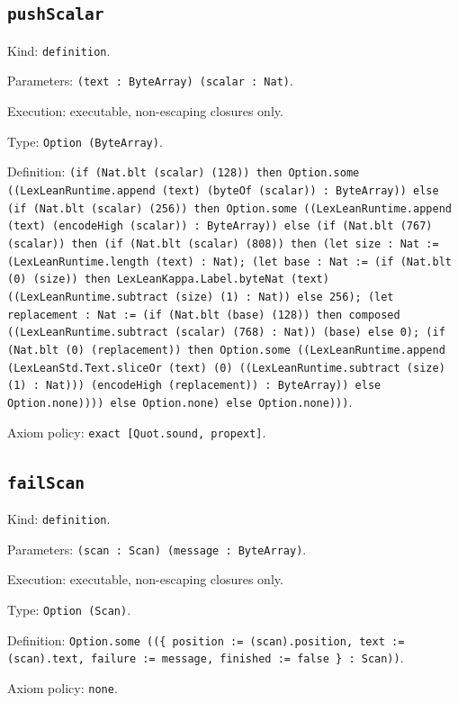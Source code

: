 \documentclass[11pt]{article}
\begin{document}
\subsection*{\texttt{pushScalar}}
\noindent Kind: \texttt{definition}.\par
\noindent Parameters: \texttt{(text : ByteArray) (scalar : Nat)}.\par
\noindent Execution: executable, non-escaping closures only.\par
\noindent Type: \texttt{Option (ByteArray)}.\par
\noindent Definition: \texttt{(if (Nat.blt (scalar) (128)) then Option.some ((LexLeanRuntime.append (text) (byteOf (scalar)) : ByteArray)) else (if (Nat.blt (scalar) (256)) then Option.some ((LexLeanRuntime.append (text) (encodeHigh (scalar)) : ByteArray)) else (if (Nat.blt (767) (scalar)) then (if (Nat.blt (scalar) (808)) then (let size : Nat := (LexLeanRuntime.length (text) : Nat); (let base : Nat := (if (Nat.blt (0) (size)) then LexLeanKappa.Label.byteNat (text) ((LexLeanRuntime.subtract (size) (1) : Nat)) else 256); (let replacement : Nat := (if (Nat.blt (base) (128)) then composed ((LexLeanRuntime.subtract (scalar) (768) : Nat)) (base) else 0); (if (Nat.blt (0) (replacement)) then Option.some ((LexLeanRuntime.append (LexLeanStd.Text.sliceOr (text) (0) ((LexLeanRuntime.subtract (size) (1) : Nat))) (encodeHigh (replacement)) : ByteArray)) else Option.none)))) else Option.none) else Option.none)))}.\par
\noindent Axiom policy: \texttt{exact [Quot.sound, propext]}.\par
\subsection*{\texttt{failScan}}
\noindent Kind: \texttt{definition}.\par
\noindent Parameters: \texttt{(scan : Scan) (message : ByteArray)}.\par
\noindent Execution: executable, non-escaping closures only.\par
\noindent Type: \texttt{Option (Scan)}.\par
\noindent Definition: \texttt{Option.some ((\{ position := (scan).position, text := (scan).text, failure := message, finished := false \} : Scan))}.\par
\noindent Axiom policy: \texttt{none}.\par
\end{document}

